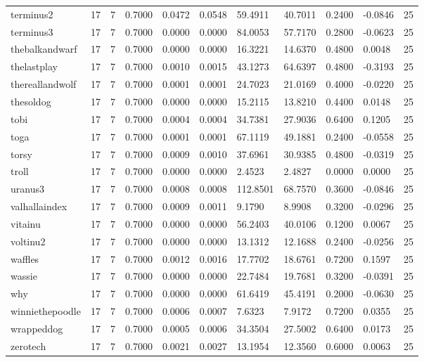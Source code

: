 \begin{table}[htbp]
\begin{tabular}{lllllllllll}
terminus2 & 17 & 7 & 0.7000 & 0.0472 & 0.0548 & 59.4911 & 40.7011 & 0.2400 & -0.0846 & 25 \\
terminus3 & 17 & 7 & 0.7000 & 0.0000 & 0.0000 & 84.0053 & 57.7170 & 0.2800 & -0.0623 & 25 \\
thebalkandwarf & 17 & 7 & 0.7000 & 0.0000 & 0.0000 & 16.3221 & 14.6370 & 0.4800 & 0.0048 & 25 \\
thelastplay & 17 & 7 & 0.7000 & 0.0010 & 0.0015 & 43.1273 & 64.6397 & 0.4800 & -0.3193 & 25 \\
thereallandwolf & 17 & 7 & 0.7000 & 0.0001 & 0.0001 & 24.7023 & 21.0169 & 0.4000 & -0.0220 & 25 \\
thesoldog & 17 & 7 & 0.7000 & 0.0000 & 0.0000 & 15.2115 & 13.8210 & 0.4400 & 0.0148 & 25 \\
tobi & 17 & 7 & 0.7000 & 0.0004 & 0.0004 & 34.7381 & 27.9036 & 0.6400 & 0.1205 & 25 \\
toga & 17 & 7 & 0.7000 & 0.0001 & 0.0001 & 67.1119 & 49.1881 & 0.2400 & -0.0558 & 25 \\
torsy & 17 & 7 & 0.7000 & 0.0009 & 0.0010 & 37.6961 & 30.9385 & 0.4800 & -0.0319 & 25 \\
troll & 17 & 7 & 0.7000 & 0.0000 & 0.0000 & 2.4523 & 2.4827 & 0.0000 & 0.0000 & 25 \\
uranus3 & 17 & 7 & 0.7000 & 0.0008 & 0.0008 & 112.8501 & 68.7570 & 0.3600 & -0.0846 & 25 \\
valhallaindex & 17 & 7 & 0.7000 & 0.0009 & 0.0011 & 9.1790 & 8.9908 & 0.3200 & -0.0296 & 25 \\
vitainu & 17 & 7 & 0.7000 & 0.0000 & 0.0000 & 56.2403 & 40.0106 & 0.1200 & 0.0067 & 25 \\
voltinu2 & 17 & 7 & 0.7000 & 0.0000 & 0.0000 & 13.1312 & 12.1688 & 0.2400 & -0.0256 & 25 \\
waffles & 17 & 7 & 0.7000 & 0.0012 & 0.0016 & 17.7702 & 18.6761 & 0.7200 & 0.1597 & 25 \\
wassie & 17 & 7 & 0.7000 & 0.0000 & 0.0000 & 22.7484 & 19.7681 & 0.3200 & -0.0391 & 25 \\
why & 17 & 7 & 0.7000 & 0.0000 & 0.0000 & 61.6419 & 45.4191 & 0.2000 & -0.0630 & 25 \\
winniethepoodle & 17 & 7 & 0.7000 & 0.0006 & 0.0007 & 7.6323 & 7.9172 & 0.7200 & 0.0355 & 25 \\
wrappeddog & 17 & 7 & 0.7000 & 0.0005 & 0.0006 & 34.3504 & 27.5002 & 0.6400 & 0.0173 & 25 \\
zerotech & 17 & 7 & 0.7000 & 0.0021 & 0.0027 & 13.1954 & 12.3560 & 0.6000 & 0.0063 & 25 \\

\end{tabular}
\end{table}

